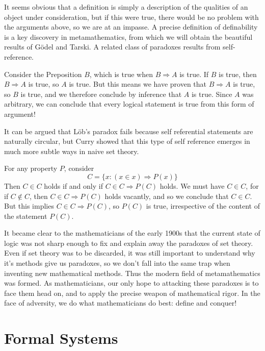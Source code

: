 It seems obvious that a definition is simply a description of the qualities of an object under consideration, but if this were true, there would be no problem with the arguments above, so we are at an impasse. A precise definition of definability is a key discovery in metamathematics, from which we will obtain the beautiful results of G\"{o}del and Tarski. A related class of paradoxes results from self-reference.

\begin{example}[L\"{o}b]
    Consider the Preposition $B$, which is true when $B \Rightarrow A$ is true. If $B$ is true, then $B \Rightarrow A$ is true, so $A$ is true. But this means we have proven that $B \Rightarrow A$ is true, so $B$ is true, and we therefore conclude by inference that $A$ is true. Since $A$ was arbitrary, we can conclude that every logical statement is true from this form of argument!
\end{example}

It can be argued that L\"{o}b's paradox fails because self referential statements are naturally circular, but Curry showed that this type of self reference emerges in much more subtle ways in naive set theory.

\begin{example}[Curry]
    For any property $P$, consider
    \[ C = \{ x : (x \in x) \Rightarrow P(x) \} \]
    Then $C \in C$ holds if and only if $C \in C \Rightarrow P(C)$ holds. We must have $C \in C$, for if $C \not \in C$, then $C \in C \Rightarrow P(C)$ holds vacantly, and so we conclude that $C \in C$. But this implies $C \in C \Rightarrow P(C)$, so $P(C)$ is true, irrespective of the content of the statement $P(C)$.
\end{example}

It became clear to the mathematicians of the early 1900s that the current state of logic was not sharp enough to fix and explain away the paradoxes of set theory. Even if set theory was to be discarded, it was still important to understand why it's methods give us paradoxes, so we don't fall into the same trap when inventing new mathematical methods. Thus the modern field of metamathematics was formed. As mathematicians, our only hope to attacking these paradoxes is to face them head on, and to apply the precise weapon of mathematical rigor. In the face of adversity, we do what mathematicians do best: define and conquer!

\section{Formal Systems}

